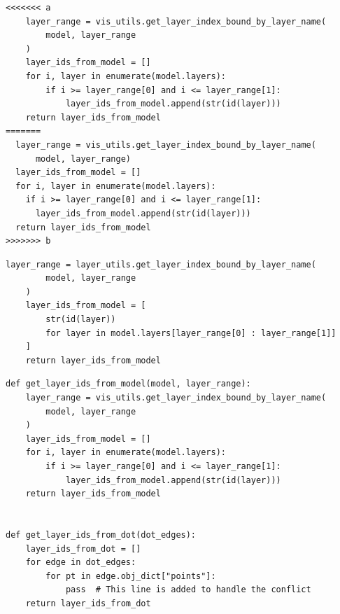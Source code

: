 %

\begin{lstlisting}[style=conflictcode,title={\textbf{The conflict} (\texttt{0x8e6579cb86af64a8})}]
<<<<<<< a
    layer_range = vis_utils.get_layer_index_bound_by_layer_name(
        model, layer_range
    )
    layer_ids_from_model = []
    for i, layer in enumerate(model.layers):
        if i >= layer_range[0] and i <= layer_range[1]:
            layer_ids_from_model.append(str(id(layer)))
    return layer_ids_from_model
=======
  layer_range = vis_utils.get_layer_index_bound_by_layer_name(
      model, layer_range)
  layer_ids_from_model = []
  for i, layer in enumerate(model.layers):
    if i >= layer_range[0] and i <= layer_range[1]:
      layer_ids_from_model.append(str(id(layer)))
  return layer_ids_from_model
>>>>>>> b
\end{lstlisting}

\begin{lstlisting}[style=conflictcode,title={\textbf{Ground-truth resolution} (8 lines, 256 characters)}]
    layer_range = layer_utils.get_layer_index_bound_by_layer_name(
        model, layer_range
    )
    layer_ids_from_model = [
        str(id(layer))
        for layer in model.layers[layer_range[0] : layer_range[1]]
    ]
    return layer_ids_from_model
\end{lstlisting}

\begin{lstlisting}[style=conflictcode,title={\textbf{Apertus-8B, without the skill} --- edit 0.368, winnowing 0.620, 597 characters}]
def get_layer_ids_from_model(model, layer_range):
    layer_range = vis_utils.get_layer_index_bound_by_layer_name(
        model, layer_range
    )
    layer_ids_from_model = []
    for i, layer in enumerate(model.layers):
        if i >= layer_range[0] and i <= layer_range[1]:
            layer_ids_from_model.append(str(id(layer)))
    return layer_ids_from_model


def get_layer_ids_from_dot(dot_edges):
    layer_ids_from_dot = []
    for edge in dot_edges:
        for pt in edge.obj_dict["points"]:
            pass  # This line is added to handle the conflict
    return layer_ids_from_dot
\end{lstlisting}

